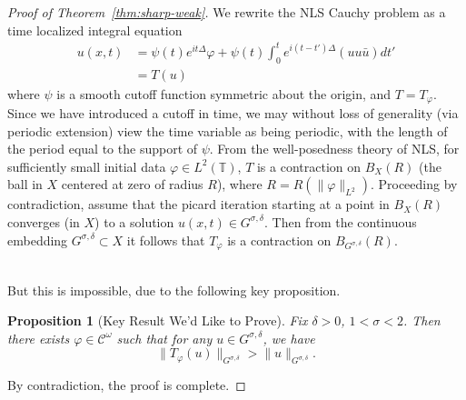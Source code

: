 \documentclass[12pt,reqno]{amsart}
\numberwithin{equation}{section}  %
\newcommand{\ci}{\mathbb{T}}
\newcommand{\vp}{\varphi}
\newtheorem{proposition}[theorem]{Proposition}
\begin{document}
\begin{proof}[Proof of Theorem~\ref{thm:sharp-weak}]
  We rewrite the NLS Cauchy problem as a time localized integral equation   
  \begin{equation*}
    \begin{split}
      u(x,t)
      & = \psi(t) e^{it \Delta} \vp + \psi(t)
      \int_{0}^{t} e^{i(t - t') \Delta}(u u \bar{u})
      dt'
      \\
      & = T(u)
    \end{split}
  \end{equation*}
  where $\psi$ is a smooth
  cutoff function symmetric about the origin, and $T = T_{\vp}$. Since we have
  introduced a cutoff in time, we may without loss of generality
  (via periodic extension) view the time
  variable as being periodic, with the length of the period equal to the support
  of $\psi$. From the well-posedness theory of NLS, for sufficiently small initial
  data $\vp \in L^{2}(\ci)$, $T$ is a contraction on
  $B_{X}(R)$ (the ball in $X$ centered at zero of radius $R$), where $R =
  R(\|\vp \|_{L^{2}})$. Proceeding by contradiction, assume that the picard
  iteration starting at a point in $B_{X}(R)$ converges (in $X$)
  to a solution $u(x,t) \in G^{\sigma, \delta}$.
  Then from the continuous embedding $G^{\sigma, \delta} \subset X$ it follows
  that $T_{\vp}$ is a contraction on $B_{G^{\sigma, \delta}}(R)$. 
  \\
  \\
  \begin{center}
  \end{center}
  But this is
  impossible, due to the following key proposition.
  \begin{proposition}[Key Result We'd Like to Prove]
    Fix $\delta > 0$, $1 < \sigma < 2$. Then there exists
    $\vp \in \mathcal{C}^{\omega}$ such that for
    any $u \in G^{\sigma, \delta}$, we have
    \begin{equation}
      \| T_{\vp}(u) \|_{G^{\sigma, \delta}} > \|u \|_{G^{\sigma, \delta}}.
    \end{equation}
    \label{prop:non-cont}
  \end{proposition}
  By contradiction, the proof is complete. 
\end{proof}
\end{document}
